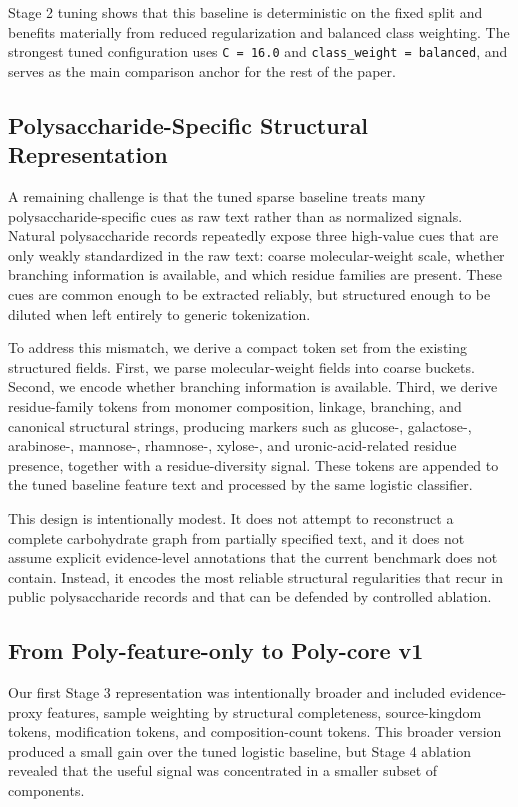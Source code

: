 \documentclass{article}
\begin{document}
Stage 2 tuning shows that this baseline is deterministic on the fixed split and benefits materially from reduced regularization and balanced class weighting. The strongest tuned configuration uses \texttt{C = 16.0} and \texttt{class\_weight = balanced}, and serves as the main comparison anchor for the rest of the paper.

\subsection{Polysaccharide-Specific Structural Representation}
\label{sec:polycore}

A remaining challenge is that the tuned sparse baseline treats many polysaccharide-specific cues as raw text rather than as normalized signals. Natural polysaccharide records repeatedly expose three high-value cues that are only weakly standardized in the raw text: coarse molecular-weight scale, whether branching information is available, and which residue families are present. These cues are common enough to be extracted reliably, but structured enough to be diluted when left entirely to generic tokenization.

To address this mismatch, we derive a compact token set from the existing structured fields. First, we parse molecular-weight fields into coarse buckets. Second, we encode whether branching information is available. Third, we derive residue-family tokens from monomer composition, linkage, branching, and canonical structural strings, producing markers such as glucose-, galactose-, arabinose-, mannose-, rhamnose-, xylose-, and uronic-acid-related residue presence, together with a residue-diversity signal. These tokens are appended to the tuned baseline feature text and processed by the same logistic classifier.

This design is intentionally modest. It does not attempt to reconstruct a complete carbohydrate graph from partially specified text, and it does not assume explicit evidence-level annotations that the current benchmark does not contain. Instead, it encodes the most reliable structural regularities that recur in public polysaccharide records and that can be defended by controlled ablation.

\subsection{From Poly-feature-only to Poly-core v1}
\label{sec:refinement}

Our first Stage 3 representation was intentionally broader and included evidence-proxy features, sample weighting by structural completeness, source-kingdom tokens, modification tokens, and composition-count tokens. This broader version produced a small gain over the tuned logistic baseline, but Stage 4 ablation revealed that the useful signal was concentrated in a smaller subset of components.
\end{document}
